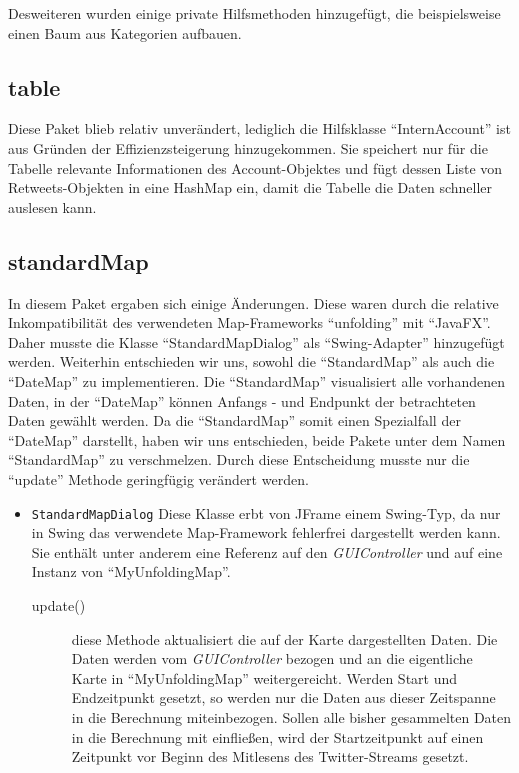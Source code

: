 Desweiteren wurden einige private Hilfsmethoden hinzugefügt, die beispielsweise einen Baum aus Kategorien aufbauen.

\subsection{table}
Diese Paket blieb relativ unverändert, lediglich die Hilfsklasse "`InternAccount"' ist aus Gründen der Effizienzsteigerung hinzugekommen.
Sie speichert nur für die Tabelle relevante Informationen des Account-Objektes und fügt dessen Liste von Retweets-Objekten in eine HashMap ein, damit die Tabelle die Daten schneller auslesen kann.
		
\subsection{standardMap}
In diesem Paket ergaben sich einige Änderungen. Diese waren durch die relative Inkompatibilität des verwendeten Map-Frameworks "`unfolding"' mit "`JavaFX"'. Daher musste die Klasse "`StandardMapDialog"' als "`Swing-Adapter"' hinzugefügt werden. Weiterhin entschieden wir uns, sowohl  die "`StandardMap"' als auch die "`DateMap"' zu implementieren. Die "`StandardMap"' visualisiert alle vorhandenen Daten, in der "`DateMap"' können Anfangs - und Endpunkt der betrachteten Daten gewählt werden. Da die "`StandardMap"' somit einen Spezialfall der "`DateMap"' darstellt, haben wir uns entschieden, beide Pakete unter dem Namen "`StandardMap"' zu verschmelzen. Durch diese Entscheidung musste nur die "`update"' Methode geringfügig verändert werden.
\begin{itemize}
	\item \lstinline{StandardMapDialog}
	\quad
	Diese Klasse erbt von JFrame einem  Swing-Typ, da nur in Swing das verwendete Map-Framework fehlerfrei dargestellt werden kann. Sie enthält unter anderem eine Referenz auf den \emph{GUIController} und auf eine Instanz von "`MyUnfoldingMap"'.
	\begin{description}
		\item[update()] diese Methode aktualisiert die auf der Karte dargestellten Daten. Die Daten werden vom \emph{GUIController} bezogen und an die eigentliche Karte in "`MyUnfoldingMap"' weitergereicht. Werden Start und Endzeitpunkt gesetzt, so werden nur die Daten aus dieser Zeitspanne in die Berechnung miteinbezogen. Sollen alle bisher gesammelten Daten in die Berechnung mit einfließen, wird der Startzeitpunkt auf einen Zeitpunkt vor Beginn des Mitlesens des Twitter-Streams gesetzt.
	\end{description}
\end{itemize}
		
